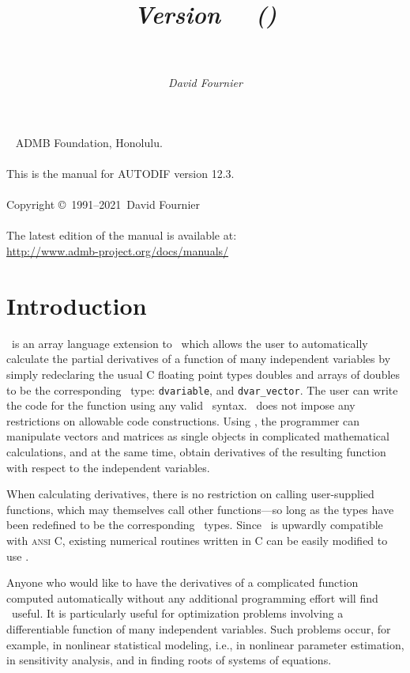 \documentclass{admbmanual}
\title{%
  \largetitlepart{AUTODIF}
  \smalltitlepart{%
    A \cplus\ Array Language Extension\\
    with Automatic Differentiation\\
    for Use in Nonlinear Modeling and Statistics}
  \vspace{4ex}\textsf{\textit{Version \admbversion~~(\admbdate)\\[3pt]
      ~%
    }}\vspace{3ex}
}
\author{\textsf{\textit{David Fournier}}}
\newcommand\admbversion{12.3}
\newcommand\admbyear{2021}
\newcommand{\question}[1]{\bigskip\noindent{\bf #1?}\par\medskip\noindent}
\begin{document}
\maketitle

~\vfill
\noindent ADMB Foundation, Honolulu.\\\\
\noindent This is the manual for AUTODIF version \admbversion.\\\\
\noindent Copyright \copyright\ 1991--\admbyear\ David Fournier\\\\
\noindent The latest edition of the manual is available at:\\
\url{http://www.admb-project.org/docs/manuals/}

\tableofcontents

\chapter{Introduction}
\label{ch:introduction}

\question{What is \scAD}
\scAD\ is an array language extension to \cplus\ which allows the user to
automatically calculate the partial derivatives of a function of many
independent variables by simply redeclaring the usual C floating point types
doubles and arrays of doubles to be the corresponding \scAD\ type:
\texttt{dvariable}, and \texttt{dvar\_vector}. The user can write the code for
the function using any valid \cplus\ syntax. \scAD\ does not impose any
restrictions on allowable code constructions. Using \scAD, the programmer can
manipulate vectors and matrices as single objects in complicated mathematical
calculations, and at the same time, obtain derivatives of the resulting function
with respect to the independent variables.

When calculating derivatives, there is no restriction on calling user-supplied
functions, which may themselves call other functions---so long as the types have
been redefined to be the corresponding \scAD\ types. Since \cplus\ is upwardly
compatible with \textsc{ansi C}, existing numerical routines written in C can be
easily modified to use \scAD.

\question{Who should use \scAD}
Anyone who would like to have the derivatives of a complicated function computed
automatically without any additional programming effort will find \scAD\ useful.
It is particularly useful for optimization problems involving a differentiable
function of many independent variables. Such problems occur, for example, in
nonlinear statistical modeling, i.e., in nonlinear parameter estimation, in
sensitivity analysis, and in finding roots of systems of equations.
\end{document}
